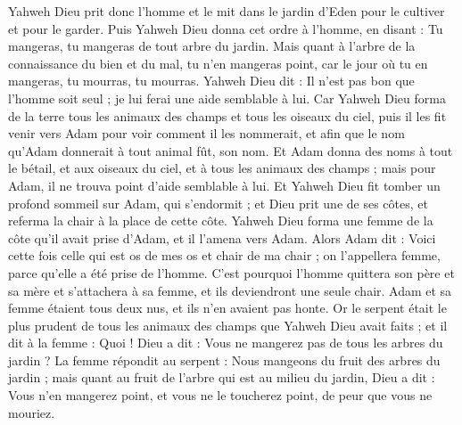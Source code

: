 \begin{multicols}{2}
Yahweh Dieu prit donc l'homme et le mit dans le jardin d'Eden pour le cultiver et pour le garder.
Puis Yahweh Dieu donna cet ordre à l'homme, en disant : Tu mangeras, tu mangeras de tout arbre du jardin.
Mais quant à l'arbre de la connaissance du bien et du mal, tu n'en mangeras point, car le jour où tu en mangeras, tu mourras, tu mourras.
Yahweh Dieu dit : Il n'est pas bon que l'homme soit seul ; je lui ferai une aide semblable à lui.
Car Yahweh Dieu forma de la terre tous les animaux des champs et tous les oiseaux du ciel, puis il les fit venir vers Adam pour voir comment il les nommerait, et afin que le nom qu'Adam donnerait à tout animal fût, son nom.
Et Adam donna des noms à tout le bétail, et aux oiseaux du ciel, et à tous les animaux des champs ; mais pour Adam, il ne trouva point d'aide semblable à lui.
Et Yahweh Dieu fit tomber un profond sommeil sur Adam, qui s'endormit ; et Dieu prit une de ses côtes, et referma la chair à la place de cette côte.
Yahweh Dieu forma une femme de la côte qu'il avait prise d'Adam, et il l’amena vers Adam.
Alors Adam dit : Voici cette fois celle qui est os de mes os et chair de ma chair ; on l’appellera femme, parce qu'elle a été prise de l'homme.
C'est pourquoi l'homme quittera son père et sa mère et s’attachera à sa femme, et ils deviendront une seule chair.
Adam et sa femme étaient tous deux nus, et ils n’en avaient pas honte.
\VerseOne{}Or le serpent était le plus prudent de tous les animaux des champs que Yahweh Dieu avait faits ; et il dit à la femme : Quoi ! Dieu a dit : Vous ne mangerez pas de tous les arbres du jardin ?
La femme répondit au serpent : Nous mangeons du fruit des arbres du jardin ;
mais quant au fruit de l'arbre qui est au milieu du jardin, Dieu a dit : Vous n'en mangerez point, et vous ne le toucherez point, de peur que vous ne mouriez.

\end{multicols}
